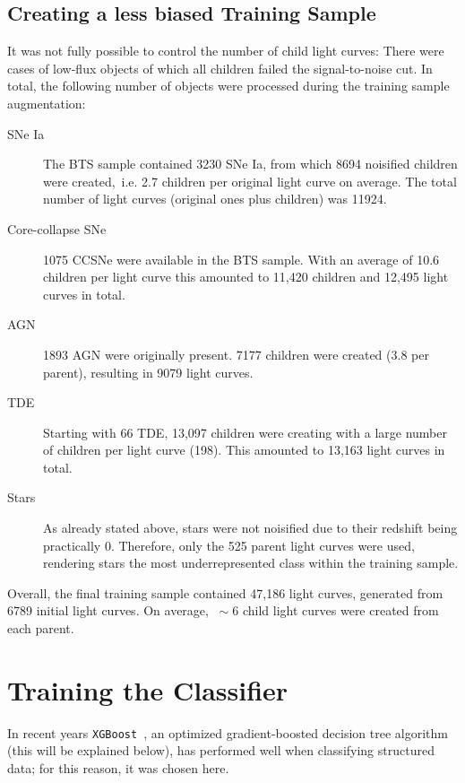 \subsection{Creating a less biased Training Sample}
It was not fully possible to control the number of child light curves: There were cases of low-flux objects of which all children failed the signal-to-noise cut. In total, the following number of objects were processed during the training sample augmentation:
\begin{description}
  \item[SNe Ia] The BTS sample contained 3230 SNe Ia, from which 8694 noisified children were created,~i.e. 2.7 children per original light curve on average. The total number of light curves (original ones plus children) was 11924.
  \item[Core-collapse SNe] 1075 CCSNe were available in the BTS sample. With an average of 10.6 children per light curve this amounted to 11,420 children and 12,495 light curves in total.
  \item[AGN] 1893 AGN were originally present. 7177 children were created (3.8 per parent), resulting in 9079 light curves.
  \item[TDE] Starting with 66 TDE, 13,097 children were creating with a large number of children per light curve (198). This amounted to 13,163 light curves in total.
  \item[Stars] As already stated above, stars were not noisified due to their redshift being practically 0. Therefore, only the 525 parent light curves were used, rendering stars the most underrepresented class within the training sample.
\end{description}
Overall, the final training sample contained 47,186 light curves, generated from 6789 initial light curves. On average, $~\sim 6$ child light curves were created from each parent.

\section{Training the Classifier}
In recent years \texttt{XGBoost}~, an optimized gradient-boosted decision tree algorithm (this will be explained below), has performed well when classifying structured data; for this reason, it was chosen here.

